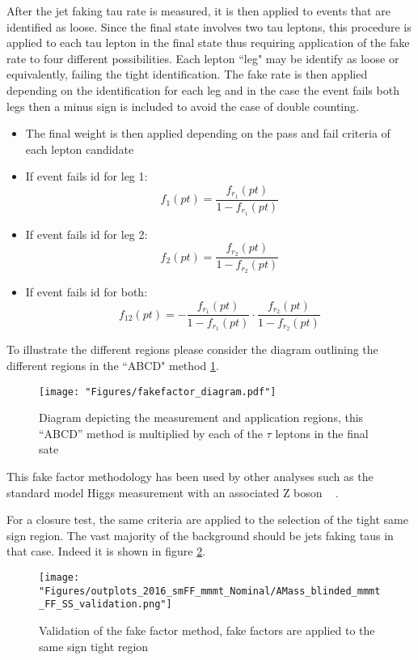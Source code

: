 After the jet faking tau rate is measured, it is then applied to events that are identified as loose. Since the final state involves two tau leptons, this procedure is applied to each tau lepton in the final state thus requiring application of the fake rate to four different possibilities. Each lepton ``leg" may be identify as loose or equivalently, failing the tight identification. The fake rate is then applied depending on the identification for each leg and in the case the event fails both legs then a minus sign is included to avoid the case of double counting. 
\begin{itemize}
\item{The final weight is then 
applied depending on the 
pass and fail criteria of each 
lepton candidate}
\item{If event fails id for leg 1:\[f_1(pt)=\frac{f_{r_1}(pt)}{1-f_{r_1}(pt)}\]}
\item{If event fails id for leg 2:\[f_2(pt)=\frac{f_{r_2}(pt)}{1-f_{r_2}(pt)}\]}
\item{If event fails id for both:\[f_{12}(pt)=-\frac{f_{r_1}(pt)}{1-f_{r_1}(pt)}\cdot\frac{f_{r_2}(pt)}{1-f_{r_2}(pt)}\]}
\end{itemize}


To illustrate the different regions please consider the diagram outlining the different regions in the ``ABCD" method \ref{fig:fakefactor_reg}. 
\begin{figure}[ht!b]
  \texttt{[image: "Figures/fakefactor\_diagram.pdf"]}
    \caption{\label{fig:fakefactor_reg} Diagram depicting the measurement and application regions, this ``ABCD'' method is multiplied by each of the $\tau$ leptons in the final sate}
\end{figure}

This fake factor methodology has been used by other analyses such as the standard model Higgs measurement with an associated Z boson ~\cite{CMS-PAS-HIG-19-010} . 

For a closure test, the same criteria are applied to the selection of the tight same sign region. The vast majority of the background should be jets faking taus in that case. Indeed it is shown in figure \ref{fig:fakefactor_validation}.
  
\begin{figure}[ht!b]
  \texttt{[image: "Figures/outplots\_2016\_smFF\_mmmt\_Nominal/AMass\_blinded\_mmmt\_FF\_SS\_validation.png"]}
    \caption{\label{fig:fakefactor_validation} Validation of the fake factor method, fake factors are applied to the same sign tight region}
\end{figure}
